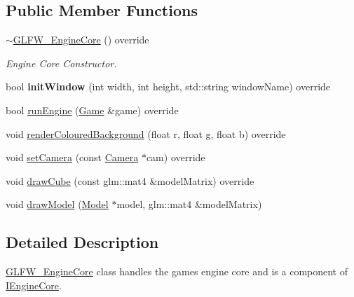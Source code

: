 \subsection*{Public Member Functions}
\begin{DoxyCompactItemize}
\item 
\mbox{\label{class_g_l_f_w___engine_core_adf17916892982f1103140b22dc1b37be}} 
\mbox{\hyperlink{class_g_l_f_w___engine_core_adf17916892982f1103140b22dc1b37be}{$\sim$\+G\+L\+F\+W\+\_\+\+Engine\+Core}} () override
\begin{DoxyCompactList}\small\item\em Engine Core Constructor. \end{DoxyCompactList}\item 
\mbox{\label{class_g_l_f_w___engine_core_aa786131ec64e7ee6779c3ac1ee8507ce}} 
bool {\bfseries init\+Window} (int width, int height, std\+::string window\+Name) override
\item 
bool \mbox{\hyperlink{class_g_l_f_w___engine_core_adf9266f1a9b5d97992691224f0f20c7b}{run\+Engine}} (\mbox{\hyperlink{class_game}{Game}} \&game) override
\item 
void \mbox{\hyperlink{class_g_l_f_w___engine_core_a6031a54b0978d6e0fd1be3f292c2059f}{render\+Coloured\+Background}} (float r, float g, float b) override
\item 
void \mbox{\hyperlink{class_g_l_f_w___engine_core_a2aba4fb8a635f96fc4057ba841670a29}{set\+Camera}} (const \mbox{\hyperlink{class_camera}{Camera}} $\ast$cam) override
\item 
void \mbox{\hyperlink{class_g_l_f_w___engine_core_a728d1f6ffd1e8526611ab0856db537c0}{draw\+Cube}} (const glm\+::mat4 \&model\+Matrix) override
\item 
void \mbox{\hyperlink{class_g_l_f_w___engine_core_a568f74989d1e203658a6fe43140a0283}{draw\+Model}} (\mbox{\hyperlink{class_model}{Model}} $\ast$model, glm\+::mat4 \&model\+Matrix)
\end{DoxyCompactItemize}


\subsection{Detailed Description}
\mbox{\hyperlink{class_g_l_f_w___engine_core}{G\+L\+F\+W\+\_\+\+Engine\+Core}} class handles the games engine core and is a component of \mbox{\hyperlink{class_i_engine_core}{I\+Engine\+Core}}. 

